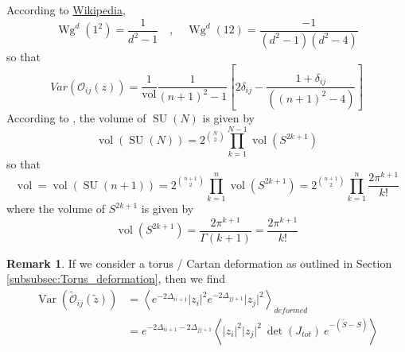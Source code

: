\documentclass[a4paper,11pt]{article}
\theoremstyle{definition}
\newtheorem{remark}{Remark}
\DeclareMathOperator{\SU}{SU}
\DeclareMathOperator{\Var}{Var}
\DeclareMathOperator{\vol}{vol}
\DeclareMathOperator{\Wg}{Wg}
\newcommand{\OO}{\mathcal O}
\begin{document}
According to \href{https://en.wikipedia.org/wiki/Weingarten_function}{Wikipedia}, 
\begin{equation}
  \Wg^{d}(1^2) = \frac{1}{d^2 - 1} \quad , \quad \Wg^d(12) = \frac{-1}{(d^2 - 1)(d^2-4)}
\end{equation}
so that 
\begin{equation}
  \boxed{
    Var(\OO_{ij}(z)) = \frac{1}{\vol} \frac{1}{(n+1)^2 - 1} \left[ 2\delta_{ij} - \frac{1 + \delta_{ij}}{( (n+1)^2 - 4)} \right]
  }
\end{equation}
According to \cite{Zhang}, the volume of $\SU(N)$ is given by
\begin{equation}
  \vol(\SU(N)) = 2^{\binom{N}{2}} \prod_{k=1}^{N-1} \vol\left( S^{2k + 1} \right)
\end{equation}
so that 
\begin{equation}
  \vol = \vol(\SU(n+1)) = 2^{\binom{n + 1}{2}}\prod_{k=1}^{n} \vol\left( S^{2k + 1} \right) = 2^{\binom{n + 1}{2}} \prod_{k=1}^n \frac{2\pi^{k+1}}{k!}
\end{equation}
where the volume of $S^{2k + 1}$ is given by 
\begin{equation}
  \vol\left( S^{2k + 1} \right) = \frac{2\pi^{k + 1}}{\Gamma(k+1)} = \frac{2\pi^{k+1}}{k!}
\end{equation}

\begin{remark}
  If we consider a torus / Cartan deformation as outlined in Section \ref{subsubsec:Torus_deformation}, then we find 
  \begin{equation}
    \begin{split} 
      \Var(\widetilde{\OO}_{ij}(\tilde z)) &= \left\langle e^{-2\Delta_{ii+1}}\lvert z_i \rvert^2 e^{-2\Delta_{jj+1}}\lvert z_j \rvert^2 \right\rangle_{deformed}\\
      &=  e^{-2\Delta_{ii+1} -2\Delta_{jj+1}} \left\langle  \lvert z_i \rvert^2\lvert z_j \rvert^2\ \det(J_{tot})\ e^{-(\tilde S - S)}\right\rangle 
    \end{split}
  \end{equation}
\end{remark}
\end{document}
